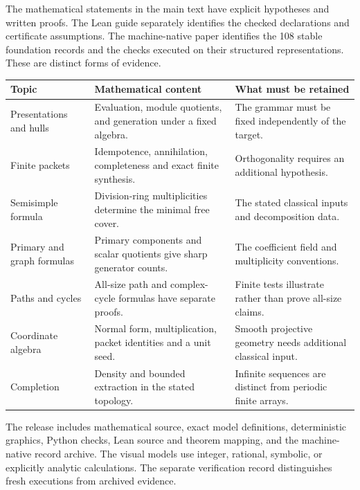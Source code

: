 
The mathematical statements in the main text have explicit hypotheses and written proofs. The Lean guide separately identifies the checked declarations and certificate assumptions. The machine-native paper identifies the 108 stable foundation records and the checks executed on their structured representations. These are distinct forms of evidence.

{\small\begin{tabularx}{\linewidth}{@{}>{\raggedright\arraybackslash}p{.23\linewidth}Y>{\raggedright\arraybackslash}p{.25\linewidth}@{}}\toprule
\textbf{Topic} & \textbf{Mathematical content} & \textbf{What must be retained}\\\midrule
Presentations and hulls & Evaluation, module quotients, and generation under a fixed algebra. & The grammar must be fixed independently of the target.\\
Finite packets & Idempotence, annihilation, completeness and exact finite synthesis. & Orthogonality requires an additional hypothesis.\\
Semisimple formula & Division-ring multiplicities determine the minimal free cover. & The stated classical inputs and decomposition data.\\
Primary and graph formulas & Primary components and scalar quotients give sharp generator counts. & The coefficient field and multiplicity conventions.\\
Paths and cycles & All-size path and complex-cycle formulas have separate proofs. & Finite tests illustrate rather than prove all-size claims.\\
Coordinate algebra & Normal form, multiplication, packet identities and a unit seed. & Smooth projective geometry needs additional classical input.\\
Completion & Density and bounded extraction in the stated topology. & Infinite sequences are distinct from periodic finite arrays.\\\bottomrule\end{tabularx}}

The release includes mathematical source, exact model definitions, deterministic graphics, Python checks, Lean source and theorem mapping, and the machine-native record archive. The visual models use integer, rational, symbolic, or explicitly analytic calculations. The separate verification record distinguishes fresh executions from archived evidence.


